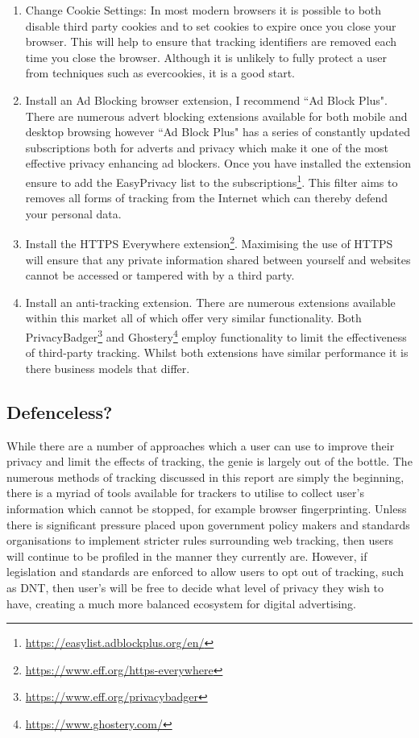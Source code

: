 \documentclass[12pt]{article}
\begin{document}
\begin{enumerate}
    \item Change Cookie Settings: In most modern browsers it is possible to both disable third party cookies and to set cookies to expire once you close your browser. This will help to ensure that tracking identifiers are removed each time you close the browser. Although it is unlikely to fully protect a user from techniques such as evercookies, it is a good start. 
    \item Install an Ad Blocking browser extension, I recommend ``Ad Block Plus". There are numerous advert blocking extensions available for both mobile and desktop browsing however ``Ad Block Plus" has a series of constantly updated subscriptions both for adverts and privacy which make it one of the most effective privacy enhancing ad blockers. Once you have installed the extension ensure to add the EasyPrivacy list to the subscriptions\footnote{\url{https://easylist.adblockplus.org/en/}}. This filter aims to removes all forms of tracking from the Internet which can thereby defend your personal data.
    \item Install the HTTPS Everywhere extension\footnote{\url{https://www.eff.org/https-everywhere}}. Maximising the use of HTTPS will ensure that any private information shared between yourself and websites cannot be accessed or tampered with by a third party. 
    \item Install an anti-tracking extension. There are numerous extensions available within this market all of which offer very similar functionality. Both PrivacyBadger\footnote{\url{https://www.eff.org/privacybadger}} and Ghostery\footnote{\url{https://www.ghostery.com/}} employ functionality to limit the effectiveness of third-party tracking. Whilst both extensions have similar performance it is there business models that differ. 
\end{enumerate}

\subsection{Defenceless?}
While there are a number of approaches which a user can use to improve their privacy and limit the effects of tracking, the genie is largely out of the bottle. The numerous methods of tracking discussed in this report are simply the beginning, there is a myriad of tools available for trackers to utilise to collect user's information which cannot be stopped, for example browser fingerprinting. Unless there is significant pressure placed upon government policy makers and standards organisations to implement stricter rules surrounding web tracking, then users will continue to be profiled in the manner they currently are. However, if legislation and standards are enforced to allow users to opt out of tracking, such as DNT, then user's will be free to decide what level of privacy they wish to have, creating a much more balanced ecosystem for digital advertising.
\end{document}
